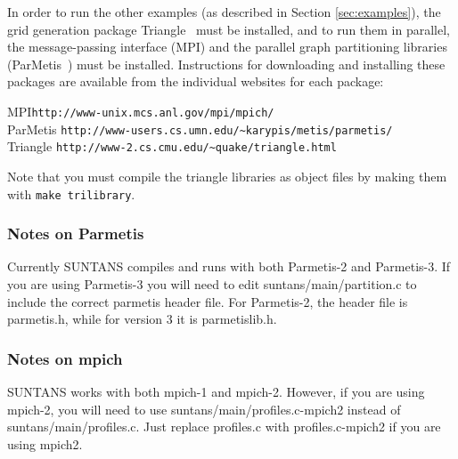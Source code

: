 In order to run the other examples (as described in Section \ref{sec:examples}), the
grid generation package Triangle~\cite{TRIANGLE[1996]} must be installed, and to
run them in parallel, the message-passing
interface (MPI) and the parallel graph partitioning libraries (ParMetis~\cite{PARMETIS[1998]})
must be installed. Instructions for 
downloading and installing these packages are available from the individual websites
for each package:
\begin{tabbing}
MPI\hspace{0.5in}\=  \verb+http://www-unix.mcs.anl.gov/mpi/mpich/+\\
ParMetis \> \verb+http://www-users.cs.umn.edu/~karypis/metis/parmetis/+\\
Triangle \> \verb+http://www-2.cs.cmu.edu/~quake/triangle.html+
\end{tabbing}
Note that you must compile the triangle libraries as object files by making them
with \verb+make trilibrary+.  

\subsubsection{Notes on Parmetis}

Currently SUNTANS compiles and runs with both Parmetis-2
and Parmetis-3.  If you are using Parmetis-3 you will need to edit suntans/main/partition.c
to include the correct parmetis header file.  For Parmetis-2, the header file is parmetis.h,
while for version 3 it is parmetislib.h.

\subsubsection{Notes on mpich}

SUNTANS works with both mpich-1 and mpich-2. However, if you are using mpich-2, you will
need to use suntans/main/profiles.c-mpich2 instead of suntans/main/profiles.c.  Just replace
profiles.c with profiles.c-mpich2 if you are using mpich2.

\medskip

